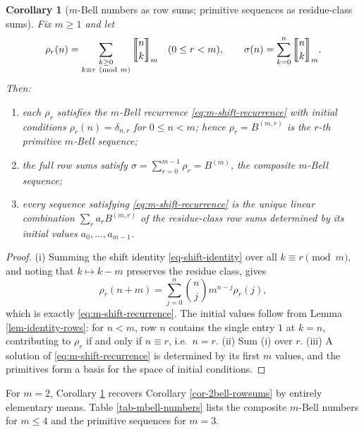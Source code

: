 \documentclass[a4paper]{amsart}
\numberwithin{equation}{section}
\newcommand{\mStirling}[0]{\genfrac{\llbracket}{\rrbracket}{0pt}{}}
\newtheorem{corollary}[theorem]{Corollary}
\begin{document}
\begin{corollary}[$m$-Bell numbers as row sums; primitive sequences as residue-class sums]\label{cor-mbell-rowsums}
Fix $m \geq 1$ and let
\[
\rho_r(n) = \sum_{\substack{k \geq 0 \\ k \equiv r \ (\mathrm{mod}\ m)}} \mStirling{n}{k}_m \quad (0 \leq r < m),
\qquad
\sigma(n) = \sum_{k=0}^{n} \mStirling{n}{k}_m .
\]
Then:
\begin{enumerate}
    \item[(i)] each $\rho_r$ satisfies the $m$-Bell recurrence \eqref{eq:m-shift-recurrence} with initial conditions $\rho_r(n) = \delta_{n,r}$ for $0 \leq n < m$; hence $\rho_r = B^{(m,r)}$ is the $r$-th primitive $m$-Bell sequence;
    \item[(ii)] the full row sums satisfy $\sigma = \sum_{r=0}^{m-1}\rho_r = B^{(m)}$, the composite $m$-Bell sequence;
    \item[(iii)] every sequence satisfying \eqref{eq:m-shift-recurrence} is the unique linear combination $\sum_{r} a_r B^{(m,r)}$ of the residue-class row sums determined by its initial values $a_0, \ldots, a_{m-1}$.
\end{enumerate}
\end{corollary}
\begin{proof}
(i) Summing the shift identity \eqref{eq-shift-identity} over all $k \equiv r \pmod m$, and noting that $k \mapsto k - m$ preserves the residue class, gives
\[
\rho_r(n+m) = \sum_{j=0}^{n}\binom{n}{j}m^{n-j}\rho_r(j),
\]
which is exactly \eqref{eq:m-shift-recurrence}. The initial values follow from Lemma \ref{lem-identity-rows}: for $n < m$, row $n$ contains the single entry $1$ at $k = n$, contributing to $\rho_r$ if and only if $n \equiv r$, i.e.\ $n = r$. (ii) Sum (i) over $r$. (iii) A solution of \eqref{eq:m-shift-recurrence} is determined by its first $m$ values, and the primitives form a basis for the space of initial conditions.
\end{proof}

For $m = 2$, Corollary \ref{cor-mbell-rowsums} recovers Corollary \ref{cor-2bell-rowsums} by entirely elementary means. Table \ref{tab-mbell-numbers} lists the composite $m$-Bell numbers for $m \le 4$ and the primitive sequences for $m = 3$.
\end{document}
